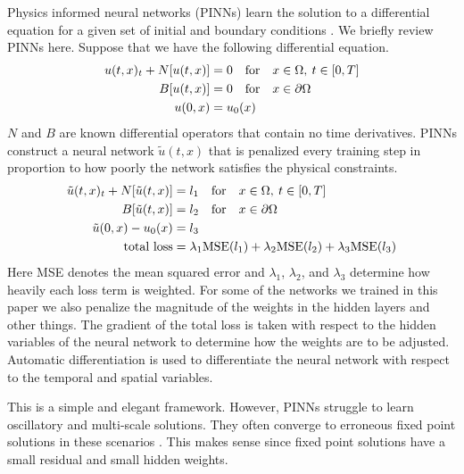 \documentclass[12pt]{article}
\def\~{\tilde}
\begin{document}
Physics informed neural networks (PINNs) learn the solution to a differential equation for a given set of initial and boundary conditions \cite{pinns}. We briefly review PINNs here. Suppose that we have the following differential equation.
\begin{align} 
	u(t,x)_t + N[u(t,x)] &= 0 \quad \text{for} \quad x \in \Omega, \: t \in [0,T] \notag\\
	B[u(t,x)] &= 0 \quad \text{for} \quad x \in \partial \Omega\\
	u(0,x) &= u_0(x) \notag
\end{align} \label{eq:dq}
$N$ and $B$ are known differential operators that contain no time derivatives. PINNs construct a neural network $\~u(t,x)$ that is penalized every training step in proportion to how poorly the network satisfies the physical constraints.
\begin{align}
	\~u(t,x)_t + N[\~u(t,x)] &= l_1 \quad \text{for} \quad x \in \Omega, \: t \in [0,T] \notag \\
	B[\~u(t,x)] &= l_2 \quad \text{for} \quad x \in \partial \Omega\\
	\~u(0,x) - u_0(x)& = l_3 \notag \\
	\text{total loss}& = \lambda_1 \text{MSE}(l_1) + \lambda_2 \text{MSE}(l_2) + \lambda_3 \text{MSE}(l_3) \notag
\end{align} \label{eq:loss}
\noindent Here MSE denotes the mean squared error and $\lambda_1$, $\lambda_2$, and $\lambda_3$ determine how heavily each loss term is weighted. For some of the networks we trained in this paper we also penalize the magnitude of the weights in the hidden layers and other things. The gradient of the total loss is taken with respect to the hidden variables of the neural network to determine how the weights are to be adjusted. Automatic differentiation is used to differentiate the neural network with respect to the temporal and spatial variables. 
\par This is a simple and elegant framework. However, PINNs struggle to learn oscillatory and multi-scale solutions. They often converge to erroneous fixed point solutions in these scenarios \cite{fixedpts}. This makes sense since fixed point solutions have a small residual and small hidden weights. 
\end{document}
